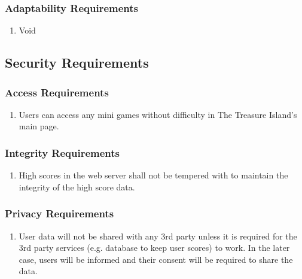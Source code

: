 \documentclass[]{article}
\begin{document}

\subsubsection{Adaptability Requirements}
\label{ssub:adaptability_requirements}

\begin{enumerate}[{MS}1. ]
	\item Void
\end{enumerate}



\subsection{Security Requirements}
\label{sub:security_requirements}

\subsubsection{Access Requirements}
\label{ssub:access_requirements}

\begin{enumerate}[{SR}1. ]
    \item Users can access any mini games without difficulty in The Treasure Island's main page.
\end{enumerate}



\subsubsection{Integrity Requirements}
\label{ssub:integrity_requirements}
\begin{enumerate}[{SR}1. ]
	\item High scores in the web server shall not be tempered with to maintain the integrity of the high score data.
\end{enumerate}

\subsubsection{Privacy Requirements}
\label{ssub:privacy_requirements}

\begin{enumerate}[{SR}1. ]
	\item User data will not be shared with any 3rd party unless it is required for the 3rd party services (e.g. database to keep user scores) to work. In the later case, users will be informed and their consent will be required to share the data.
\end{enumerate}
\end{document}
